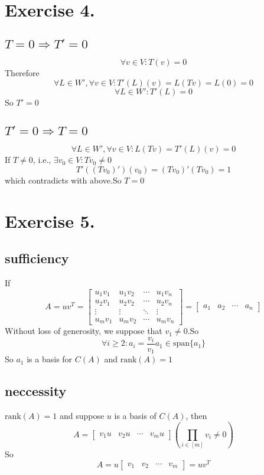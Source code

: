 \documentclass[12pt, a4paper, oneside]{article}
\begin{document}
    \section*{Exercise 4.}
        \subsection*{$T=0\Rightarrow T'=0$}
            $$
                \forall v\in V:T(v)=0
            $$
            Therefore
            $$
                \forall L\in W',\forall v\in V:T'(L)(v)=L(Tv)=L(0)=0
            $$
            $$
                \forall L\in W':T'(L)=0
            $$
            So $T'=0$
        \subsection*{$T'=0\Rightarrow T=0$}
            $$
                \forall L\in W', \forall v\in V:L(Tv)=T'(L)(v)=0
            $$
            If $T\neq 0$, i.e., $\exists v_0\in V:Tv_0\neq 0$
            $$
                T'((Tv_0)')(v_0)=(Tv_0)'(Tv_0)=1
            $$
            which contradicts with above.So $T=0$
    \section*{Exercise 5.}
        \subsection*{sufficiency}
            If
            $$
                A=uv^T=\begin{bmatrix}
                    u_1v_1 & u_1v_2 & \cdots & u_1v_n\\
                    u_2v_1 & u_2v_2 & \cdots & u_2v_n\\
                    \vdots & \vdots & \ddots & \vdots\\
                    u_mv_1 & u_mv_2 & \cdots & u_mv_n
                \end{bmatrix}=\begin{bmatrix}
                    a_1 & a_2 & \cdots & a_n
                \end{bmatrix}
            $$
            Without loss of generosity, we suppose that $v_1\neq 0$.So
            $$
                \forall i\geq 2: a_i=\frac{v_i}{v_1}a_1\in\text{span}\{a_1\}
            $$
            So $a_1$ is a basis for $C(A)$ and $\text{rank}(A)=1$
        \subsection*{neccessity}
            $\text{rank}(A)=1$ and suppose $u$ is a basis of $C(A)$, then
            $$
                A=\begin{bmatrix}
                    v_1u & v_2u & \cdots & v_mu
                \end{bmatrix} (\prod_{i\in[m]}v_i\neq 0)
            $$
            So
            $$
                A=u\begin{bmatrix}
                    v_1 & v_2 & \cdots & v_m
                \end{bmatrix}=uv^T
            $$
\end{document}
